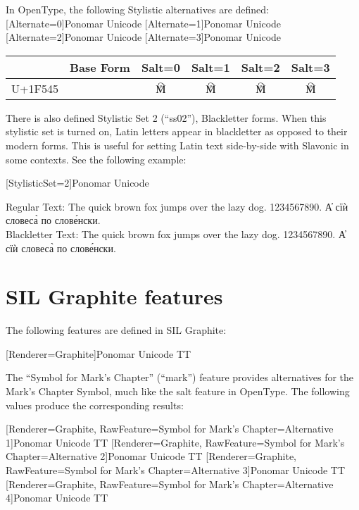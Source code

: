 In OpenType, the following Stylistic alternatives are defined:
\newfontfamily{\salt}[Alternate=0]{Ponomar Unicode}
\newfontfamily{\salta}[Alternate=1]{Ponomar Unicode}
\newfontfamily{\saltb}[Alternate=2]{Ponomar Unicode}
\newfontfamily{\saltc}[Alternate=3]{Ponomar Unicode}

\begin{tabular}{lccccc}
	& Base Form	& Salt=0	& Salt=1	& Salt=2	& Salt=3 \\
\hline
U+1F545	& {\glyphfont{\large 🕅 }}	& {\salt\large 🕅} & {\salta\large 🕅} & {\saltb\large 🕅} & {\saltc\large 🕅} \\
\hline
\end{tabular}

There is also defined Stylistic Set 2 (``ss02''), Blackletter forms. When this stylistic set is turned on, 
Latin letters appear in blackletter as opposed to their modern forms. This is useful for setting Latin text side-by-side with Slavonic in some contexts. See the following example:

\newfontfamily{\blackletter}[StylisticSet=2]{Ponomar Unicode}

Regular Text:
{\glyphfont \large The quick brown fox jumps over the lazy dog. 1234567890. А҆ сїѝ словеса̀ по слове́нски. } \\

Blackletter Text:
{\blackletter \large The quick brown fox jumps over the lazy dog. 1234567890. А҆ сїѝ словеса̀ по слове́нски.  } \\

\section{SIL Graphite features}

The following features are defined in SIL Graphite:

\newfontfamily{\graph}[Renderer=Graphite]{Ponomar Unicode TT}

The ``Symbol for Mark's Chapter'' (``mark'') feature provides alternatives for the Mark's Chapter Symbol, much like the salt feature in OpenType. 
The following values produce the corresponding results:

\newfontfamily{\graphA}[Renderer=Graphite, RawFeature={Symbol for Mark's Chapter=Alternative 1}]{Ponomar Unicode TT}
\newfontfamily{\graphB}[Renderer=Graphite, RawFeature={Symbol for Mark's Chapter=Alternative 2}]{Ponomar Unicode TT}
\newfontfamily{\graphC}[Renderer=Graphite, RawFeature={Symbol for Mark's Chapter=Alternative 3}]{Ponomar Unicode TT}
\newfontfamily{\graphD}[Renderer=Graphite, RawFeature={Symbol for Mark's Chapter=Alternative 4}]{Ponomar Unicode TT}

